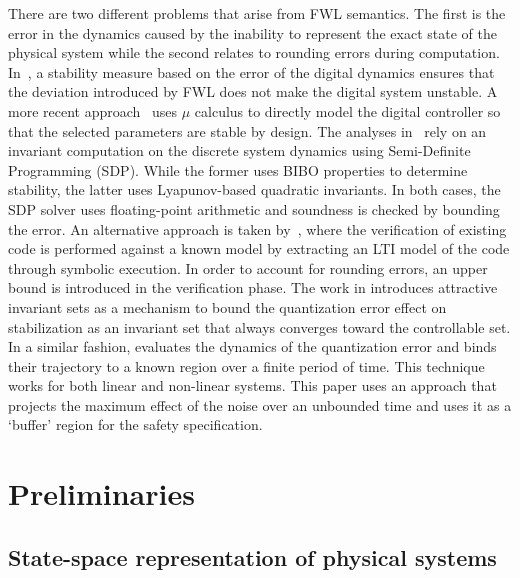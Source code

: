 \documentclass[runningheads,a4paper]{llncs}
\newcommand{\addtodo}[1]{{\color{red} TODO: #1}}
\begin{document}
There are two different problems that arise from FWL semantics.  The first
is the error in the dynamics caused by the inability to represent the exact
state of the physical system while the second relates to rounding errors
during computation.  In~\cite{fialho1994stability}, a stability measure
based on the error of the digital dynamics ensures that the deviation
introduced by FWL does not make the digital system unstable.  A more recent
approach~\cite{DBLP:journals/automatica/WuLCC09} uses $\mu$ calculus to
directly model the digital controller so that the selected parameters are
stable by design.  The analyses
in~\cite{DBLP:conf/hybrid/RouxJG15,DBLP:conf/hybrid/WangGRJF16} rely on an
invariant computation on the discrete system dynamics using Semi-Definite
Programming (SDP).  While the former uses BIBO properties to determine
stability, the latter uses Lyapunov-based quadratic invariants.  In both
cases, the SDP solver uses floating-point arithmetic and soundness is
checked by bounding the error.  An alternative approach is taken
by~\cite{park2016scalable}, where the verification of existing code is
performed against a known model by extracting an LTI model of the code
through symbolic execution.  In order to account for rounding errors, an
upper bound is introduced in the verification phase.
The work in \cite{picasso2003stabilization,picasso2002construction} introduces
attractive invariant sets as a mechanism to bound the quantization error effect
on stabilization as an invariant set that always converges toward the controllable
set. In a similar fashion, \cite{liberzon2003hybrid} evaluates the dynamics of the
quantization error and binds their trajectory to a known region over a finite
period of time. This technique works for both linear and non-linear systems.
This paper uses an approach that projects the maximum effect of the noise over
an unbounded time and uses it as a `buffer' region for the safety specification.


\section{Preliminaries}
\label{sec:preliminaries}

\subsection{State-space representation of physical systems} 
\label{ssec:ssrepresentation}
\end{document}

